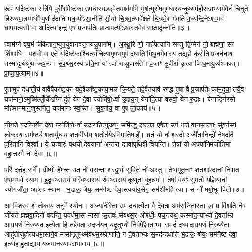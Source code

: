 रू॒पं यदिष्ट॑का॒ रात्रि॑यै॒ पुरी॑ष॒मिष्ट॑का उपधा॒स्यञ्छ्वे॒तमश्व॑म॒भि मृ॑शे॒त्पुरी॑षमुपधा॒स्यन्कृ॒ष्णम॑होरा॒त्राभ्या॑मे॒वैनं॑ चिनुते हिरण्यपा॒त्रम्मधोः᳚ पू॒र्णं द॑दाति मध॒व्यो॑\-ऽसा॒नीति॑ सौ॒र्या चि॒त्रव॒त्यावे᳚क्षते चि॒त्रमे॒व भ॑वति म॒ध्यन्दि॒ने\-ऽश्व॒मव॑ घ्रापयत्य॒सौ वा आ॑दि॒त्य इन्द्र॑ ए॒ष प्र॒जाप॑तिः प्राजाप॒त्यो\-ऽश्व॒स्तमे॒व सा॒क्षादृ॑ध्नोति॥३॥

{}

त्वाम॑ग्ने वृष॒भं चेकि॑तान॒म्पुन॒र्युवा॑नञ्ज॒नय॑न्नु॒पागा᳚म्। अ॒स्थू॒रि णो॒ गार्\mbox{}ह॑पत्यानि सन्तु ति॒ग्मेन॑ नो॒ ब्रह्म॑णा॒ सꣳ शि॑शाधि। प॒शवो॒ वा ए॒ते यदिष्ट॑का॒श्चित्यां᳚चित्यामृष॒भमुप॑ दधाति मिथु॒नमे॒वास्य॒ तद्य॒ज्ञे क॑रोति प्र॒जन॑नाय॒ तस्मा᳚द्यू॒थेयू॑थ ऋष॒भः। सं॒व॒थ्स॒रस्य॑ प्रति॒मां यां त्वा॑ रात्र्यु॒पास॑ते। प्र॒जाꣳ सु॒वीरां᳚ कृ॒त्वा विश्व॒मायु॒र्व्य॑श्ञवत्। प्रा॒जा॒प॒त्याम्॥४॥

ए॒तामुप॑ दधाती॒यं वावैषैका᳚ष्ट॒का यदे॒वैका᳚ष्ट॒काया॒मन्नं॑ क्रि॒यते॒ तदे॒वैतयाव॑ रुन्द्ध ए॒षा वै प्र॒जाप॑तेः काम॒दुघा॒ तयै॒व यज॑मानो॒\-ऽमुष्मि॑ल्लोँ॒के᳚\-ऽग्निं दु॑हे॒ येन॑ दे॒वा ज्योति॑षो॒र्ध्वा उ॒दाय॒न् येना॑दि॒त्या वस॑वो॒ येन॑ रु॒द्राः। येनाङ्गि॑रसो महि॒मान॑मान॒शुस्तेनै॑तु॒ यज॑मानः स्व॒स्ति। सु॒व॒र्गाय॒ वा ए॒ष लो॒काय॑॥५॥

ची॒य॒ते॒ यद॒ग्निर्येन॑ दे॒वा ज्योति॑षो॒र्ध्वा उ॒दाय॒न्नित्युख्य॒ꣳ॒ समि॑न्द्ध॒ इष्ट॑का ए॒वैता उप॑ धत्ते वानस्प॒त्याः सु॑व॒र्गस्य॑ लो॒कस्य॒ सम॑ष्ट्यै श॒तायु॑धाय श॒तवी᳚र्याय श॒तोत॑ये\-ऽभिमाति॒षाहे᳚। श॒तं यो नः॑ श॒रदो॒ अजी॑ता॒निन्द्रो॑ नेष॒दति॑ दुरि॒तानि॒ विश्वा᳚। ये च॒त्वारः॑ प॒थयो॑ देव॒याना॑ अन्त॒रा द्यावा॑पृथि॒वी वि॒यन्ति॑। तेषां॒ यो अज्या॑नि॒मजी॑तिमा॒ वहा॒त्तस्मै॑ नो देवाः॥६॥

परि॑ दत्ते॒ह सर्वे᳚। ग्री॒ष्मो हे॑म॒न्त उ॒त नो॑ वस॒न्तः श॒रद्व॒र्\mbox{}षाः सु॑वि॒तं नो॑ अस्तु। तेषा॑मृतू॒नाꣳ श॒तशा॑रदानां निवा॒त ए॑षा॒मभ॑ये स्याम। इ॒दु॒व॒थ्स॒राय॑ परिवथ्स॒राय॑ संवथ्स॒राय॑ कृणुता बृ॒हन्नमः॑। तेषां᳚ व॒यꣳ सु॑म॒तौ य॒ज्ञिया॑नां॒ ज्योगजी॑ता॒ अह॑ताः स्याम। भ॒द्रान्नः॒ श्रेयः॒ सम॑नैष्ट देवा॒स्त्वया॑व॒सेन॒ सम॑शीमहि त्वा। स नो॑ मयो॒भूः पि॑तो॥७॥

आ वि॑शस्व॒ शं तो॒काय॑ त॒नुवे᳚ स्यो॒नः। अज्या॑नीरे॒ता उप॑ दधात्ये॒ता वै दे॒वता॒ अप॑राजिता॒स्ता ए॒व प्र वि॑शति॒ नैव जी॑यते ब्रह्मवा॒दिनो॑ वदन्ति॒ यद॑र्धमा॒सा मासा॑ ऋ॒तवः॑ संवथ्स॒र ओष॑धीः॒ पच॒न्त्यथ॒ कस्मा॑द॒न्याभ्यो॑ दे॒वता᳚भ्य आग्रय॒णं निरु॑प्यत॒ इत्ये॒ता हि तद्दे॒वता॑ उ॒दज॑य॒न् यदृ॒तुभ्यो॑ नि॒र्वपे᳚द्दे॒वता᳚भ्यः स॒मदं॑ दध्यादाग्रय॒णं नि॒रुप्यै॒ता आहु॑तीर्जुहोत्यर्धमा॒साने॒व मासा॑नृ॒तून्थ्सं॑वथ्स॒रम्प्री॑णाति॒ न दे॒वता᳚भ्यः स॒मद॑न्दधाति भ॒द्रान्नः॒ श्रेयः॒ सम॑नैष्ट देवा॒ इत्या॑ह हु॒ताद्या॑य॒ यज॑मान॒स्याप॑राभावाय॥८॥

